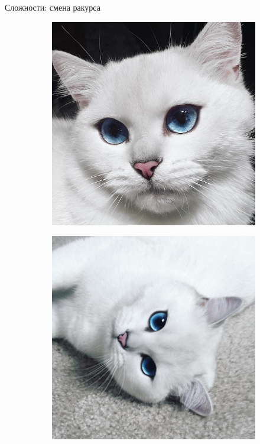 \documentclass[aspectratio=169]{beamer}
\begin{document}
\begin{frame}{Сложности: смена ракурса}
    \begin{figure}
        \begin{subfigure}[b]{.325\linewidth}
            \centering
            \includegraphics[width=\linewidth]{graphs/fig8_0.jpg}
        \end{subfigure}
        \begin{subfigure}[b]{.325\linewidth}
            \centering
            \includegraphics[width=\linewidth]{graphs/fig8_1.jpg}

\end{subfigure}
\end{figure}
\end{frame}
\end{document}
